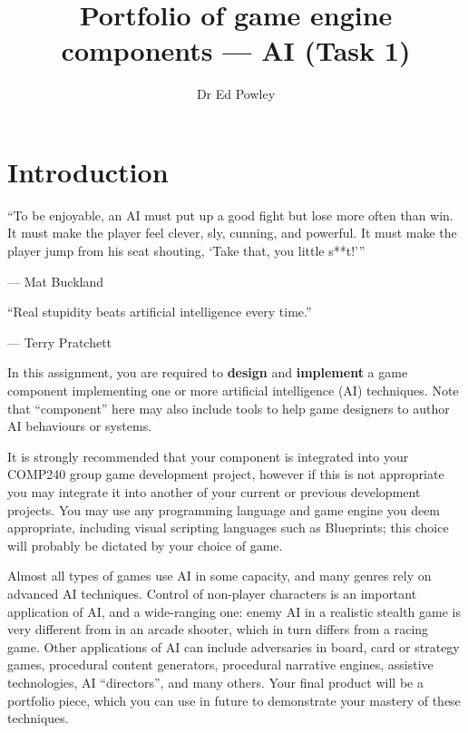 \documentclass{../../fal_assignment}
\title{Portfolio of game engine components --- AI (Task 1)}
\author{Dr Ed Powley}
\begin{document}
\maketitle

\section*{Introduction}

\begin{marginquote}
``To be enjoyable, an AI must put up a good fight but lose more often than win. It must make the player feel clever, sly, cunning, and powerful. It must make the player jump from his seat shouting, `Take that, you little s**t!'\thinspace''

--- Mat Buckland

    \marginquoterule

``Real stupidity beats artificial intelligence every time.''

--- Terry Pratchett
\end{marginquote}

In this assignment, you are required to \textbf{design} and \textbf{implement} a game component
implementing one or more artificial intelligence (AI) techniques.
Note that ``component'' here may also include tools to help game designers to author AI behaviours or systems.

It is strongly recommended that your component is integrated into your COMP240 group game development project,
however if this is not appropriate you may integrate it into another of your current or previous development projects.
You may use any programming language and game engine you deem appropriate,
including visual scripting languages such as Blueprints;
this choice will probably be dictated by your choice of game.

Almost all types of games use AI in some capacity, and many genres rely on advanced AI techniques.
Control of non-player characters is an important application of AI,
and a wide-ranging one: enemy AI in a realistic stealth game is very different from in an arcade shooter,
which in turn differs from a racing game.
Other applications of AI can include adversaries in board, card or strategy games,
procedural content generators,
procedural narrative engines,
assistive technologies,
AI ``directors'',
and many others.
Your final product will be a portfolio piece, which you can use in future to demonstrate your mastery of these techniques.
\end{document}
